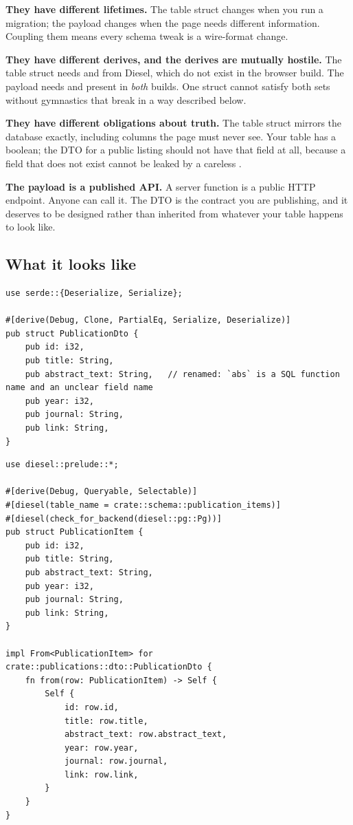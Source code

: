 \begin{why}
\textbf{They have different lifetimes.} The table struct changes when you run a migration; the
payload changes when the page needs different information. Coupling them means every schema tweak
is a wire-format change.

\textbf{They have different derives, and the derives are mutually hostile.} The table struct needs
 and  from Diesel, which do not exist in the browser build. The
payload needs  and  present in \emph{both} builds. One struct
cannot satisfy both sets without  gymnastics that break in a way described below.

\textbf{They have different obligations about truth.} The table struct mirrors the database
exactly, including columns the page must never see. Your  table has a
 boolean; the DTO for a public listing should not have that field at all, because a
field that does not exist cannot be leaked by a careless .

\textbf{The payload is a published API.} A server function is a public HTTP endpoint. Anyone can
call it. The DTO is the contract you are publishing, and it deserves to be designed rather than
inherited from whatever your table happens to look like.
\end{why}

\subsection{What it looks like}

\begin{lstlisting}[style=rs,caption={\file{src/publications/dto.rs} --- ungated, no Diesel anywhere.}]
use serde::{Deserialize, Serialize};

#[derive(Debug, Clone, PartialEq, Serialize, Deserialize)]
pub struct PublicationDto {
    pub id: i32,
    pub title: String,
    pub abstract_text: String,   // renamed: `abs` is a SQL function name and an unclear field name
    pub year: i32,
    pub journal: String,
    pub link: String,
}
\end{lstlisting}

\begin{lstlisting}[style=rs,caption={\file{src/publications/model.rs} --- server only, unchanged in spirit from today.}]
use diesel::prelude::*;

#[derive(Debug, Queryable, Selectable)]
#[diesel(table_name = crate::schema::publication_items)]
#[diesel(check_for_backend(diesel::pg::Pg))]
pub struct PublicationItem {
    pub id: i32,
    pub title: String,
    pub abstract_text: String,
    pub year: i32,
    pub journal: String,
    pub link: String,
}

impl From<PublicationItem> for crate::publications::dto::PublicationDto {
    fn from(row: PublicationItem) -> Self {
        Self {
            id: row.id,
            title: row.title,
            abstract_text: row.abstract_text,
            year: row.year,
            journal: row.journal,
            link: row.link,
        }
    }
}
\end{lstlisting}


